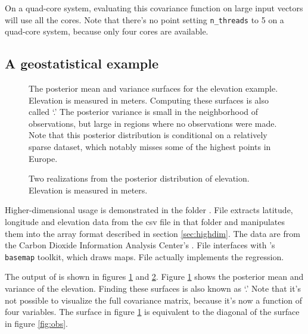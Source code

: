 \documentclass[]{manual}
\begin{document}
On a quad-core system, evaluating this covariance function on large input vectors will use all the cores. Note that there's no point setting \texttt{n_threads} to 5 on a quad-core system, because only four cores are available.


\subsection{A geostatistical example}\label{sub:geostat}
\begin{figure}
    \centering
    \caption{The posterior mean and variance surfaces for the elevation example. Elevation is measured in meters. Computing these surfaces is also called `.' The posterior variance is small in the neighborhood of observations, but large in regions where no observations were made. Note that this posterior distribution is conditional on a relatively sparse dataset, which notably misses some of the highest points in Europe.}
    \label{fig:elev}
\end{figure}
\begin{figure}
    \centering
    \caption{Two realizations from the posterior distribution of elevation. Elevation is measured in meters.}
    \label{fig:elevreal}
\end{figure}
Higher-dimensional usage is demonstrated in the folder . File  extracts latitude, longitude and elevation data from the csv file in that folder and manipulates them into the array format described in section \ref{sec:highdim}. The data are from the Carbon Dioxide Information Analysis Center's . File  interfaces with 's \texttt{basemap} toolkit, which draws maps. File  actually implements the regression.
% 

The output of  is shown in figures \ref{fig:elev} and \ref{fig:elevreal}. Figure \ref{fig:elev} shows the posterior mean and variance of the elevation. Finding these surfaces is also known as `.' Note that it's not possible to visualize the full covariance matrix, because it's now a function of four variables. The surface in figure \ref{fig:elev} is equivalent to the diagonal of the surface in figure \ref{fig:obs}.
\end{document}
